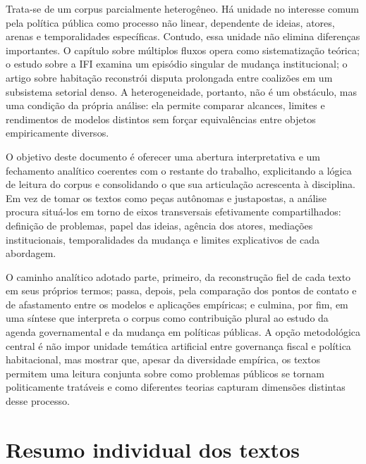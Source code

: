 \documentclass[12pt,a4paper]{article}
\begin{document}
Trata-se de um corpus parcialmente heterogêneo. Há unidade no interesse comum pela política pública como processo não linear, dependente de ideias, atores, arenas e temporalidades específicas. Contudo, essa unidade não elimina diferenças importantes. O capítulo sobre múltiplos fluxos opera como sistematização teórica; o estudo sobre a IFI examina um episódio singular de mudança institucional; o artigo sobre habitação reconstrói disputa prolongada entre coalizões em um subsistema setorial denso. A heterogeneidade, portanto, não é um obstáculo, mas uma condição da própria análise: ela permite comparar alcances, limites e rendimentos de modelos distintos sem forçar equivalências entre objetos empiricamente diversos.\parencite{brasil2022_abordagens_contemporaneas,anonsd_sem_titulo,ferreira2019_politica_habitacional}

O objetivo deste documento é oferecer uma abertura interpretativa e um fechamento analítico coerentes com o restante do trabalho, explicitando a lógica de leitura do corpus e consolidando o que sua articulação acrescenta à disciplina. Em vez de tomar os textos como peças autônomas e justapostas, a análise procura situá-los em torno de eixos transversais efetivamente compartilhados: definição de problemas, papel das ideias, agência dos atores, mediações institucionais, temporalidades da mudança e limites explicativos de cada abordagem.

O caminho analítico adotado parte, primeiro, da reconstrução fiel de cada texto em seus próprios termos; passa, depois, pela comparação dos pontos de contato e de afastamento entre os modelos e aplicações empíricas; e culmina, por fim, em uma síntese que interpreta o corpus como contribuição plural ao estudo da agenda governamental e da mudança em políticas públicas. A opção metodológica central é não impor unidade temática artificial entre governança fiscal e política habitacional, mas mostrar que, apesar da diversidade empírica, os textos permitem uma leitura conjunta sobre como problemas públicos se tornam politicamente tratáveis e como diferentes teorias capturam dimensões distintas desse processo.\parencite{brasil2022_abordagens_contemporaneas,anonsd_sem_titulo,ferreira2019_politica_habitacional}



\section{Resumo individual dos textos}
\label{sec:org140e24d}
\end{document}
